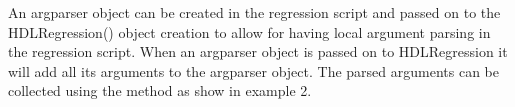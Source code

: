 \documentclass[letterpaper,10pt,english]{sphinxmanual}
\begin{document}
\sphinxAtStartPar
{}

\begin{sphinxVerbatim}[commandchars=\\\{\}]
   

   
\end{sphinxVerbatim}

\sphinxAtStartPar
An argparser object can be created in the regression script and passed on to the HDLRegression() object creation to allow
for having local argument parsing in the regression script. When an argparser object is passed on to HDLRegression it will
add all its arguments to the argparser object. The parsed arguments can be collected using the {\hyperref[\detokenize{api:get-args}]{}} method as show
in example 2.

\sphinxAtStartPar
{}
\end{document}
